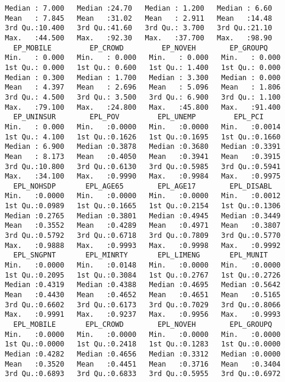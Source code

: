 \documentclass[
  12pt,
]{article}
\begin{document}
\begin{verbatim}
 Median : 7.000   Median :24.70   Median : 1.200   Median : 6.60  
 Mean   : 7.845   Mean   :31.02   Mean   : 2.911   Mean   :14.48  
 3rd Qu.:10.400   3rd Qu.:41.60   3rd Qu.: 3.700   3rd Qu.:21.10  
 Max.   :44.500   Max.   :92.30   Max.   :37.700   Max.   :98.90  
   EP_MOBILE         EP_CROWD         EP_NOVEH        EP_GROUPQ     
 Min.   : 0.000   Min.   : 0.000   Min.   : 0.000   Min.   : 0.000  
 1st Qu.: 0.000   1st Qu.: 0.600   1st Qu.: 1.400   1st Qu.: 0.000  
 Median : 0.300   Median : 1.700   Median : 3.300   Median : 0.000  
 Mean   : 4.397   Mean   : 2.696   Mean   : 5.096   Mean   : 1.806  
 3rd Qu.: 4.500   3rd Qu.: 3.500   3rd Qu.: 6.900   3rd Qu.: 1.100  
 Max.   :79.100   Max.   :24.800   Max.   :45.800   Max.   :91.400  
   EP_UNINSUR        EPL_POV         EPL_UNEMP         EPL_PCI      
 Min.   : 0.000   Min.   :0.0000   Min.   :0.0000   Min.   :0.0014  
 1st Qu.: 4.100   1st Qu.:0.1626   1st Qu.:0.1695   1st Qu.:0.1660  
 Median : 6.900   Median :0.3878   Median :0.3680   Median :0.3391  
 Mean   : 8.173   Mean   :0.4050   Mean   :0.3941   Mean   :0.3915  
 3rd Qu.:10.800   3rd Qu.:0.6130   3rd Qu.:0.5985   3rd Qu.:0.5941  
 Max.   :34.100   Max.   :0.9990   Max.   :0.9984   Max.   :0.9975  
   EPL_NOHSDP       EPL_AGE65        EPL_AGE17        EPL_DISABL    
 Min.   :0.0000   Min.   :0.0000   Min.   :0.0000   Min.   :0.0012  
 1st Qu.:0.0989   1st Qu.:0.1665   1st Qu.:0.2154   1st Qu.:0.1306  
 Median :0.2765   Median :0.3801   Median :0.4945   Median :0.3449  
 Mean   :0.3552   Mean   :0.4289   Mean   :0.4971   Mean   :0.3807  
 3rd Qu.:0.5792   3rd Qu.:0.6718   3rd Qu.:0.7809   3rd Qu.:0.5770  
 Max.   :0.9888   Max.   :0.9993   Max.   :0.9998   Max.   :0.9992  
   EPL_SNGPNT       EPL_MINRTY       EPL_LIMENG       EPL_MUNIT     
 Min.   :0.0000   Min.   :0.0148   Min.   :0.0000   Min.   :0.0000  
 1st Qu.:0.2095   1st Qu.:0.3084   1st Qu.:0.2767   1st Qu.:0.2726  
 Median :0.4319   Median :0.4388   Median :0.4695   Median :0.5642  
 Mean   :0.4430   Mean   :0.4652   Mean   :0.4651   Mean   :0.5165  
 3rd Qu.:0.6602   3rd Qu.:0.6173   3rd Qu.:0.7029   3rd Qu.:0.8066  
 Max.   :0.9991   Max.   :0.9237   Max.   :0.9956   Max.   :0.9993  
   EPL_MOBILE       EPL_CROWD        EPL_NOVEH        EPL_GROUPQ    
 Min.   :0.0000   Min.   :0.0000   Min.   :0.0000   Min.   :0.0000  
 1st Qu.:0.0000   1st Qu.:0.2418   1st Qu.:0.1283   1st Qu.:0.0000  
 Median :0.4282   Median :0.4656   Median :0.3312   Median :0.0000  
 Mean   :0.3520   Mean   :0.4451   Mean   :0.3716   Mean   :0.3404  
 3rd Qu.:0.6893   3rd Qu.:0.6833   3rd Qu.:0.5955   3rd Qu.:0.6972  

\end{verbatim}
\end{document}
